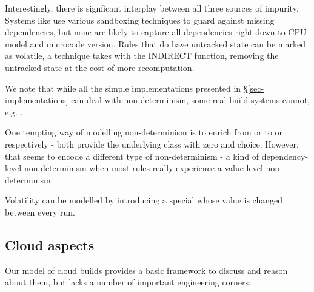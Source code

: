 Interestingly, there is signficant interplay between all three sources of impurity. Systems like \Bazel use various sandboxing techniques to guard against missing dependencies, but none are likely to capture all dependencies right down to CPU model and microcode version. Rules that do have untracked state can be marked as volatile, a technique \Excel takes with the \textsf{INDIRECT} function, removing the untracked-state at the cost of more recomputation.

We note that while all the simple implementations presented in \S\ref{sec-implementations} can deal with non-determinism, some real build systems cannot, e.g. \Buck.

One tempting way of modelling non-determinism is to enrich  from  or  to  or  respectively - both provide the underlying class with zero and choice. However, that seems to encode a different type of non-determinism - a kind of dependency-level non-determinism when most rules really experience a value-level non-determinism.

Volatility can be modelled by introducing a special  whose value is changed between every run.

\subsection{Cloud aspects}\label{sec-cloud-aspects}

Our model of cloud builds provides a basic framework to discuss and reason about them, but lacks a number of important engineering corners:

